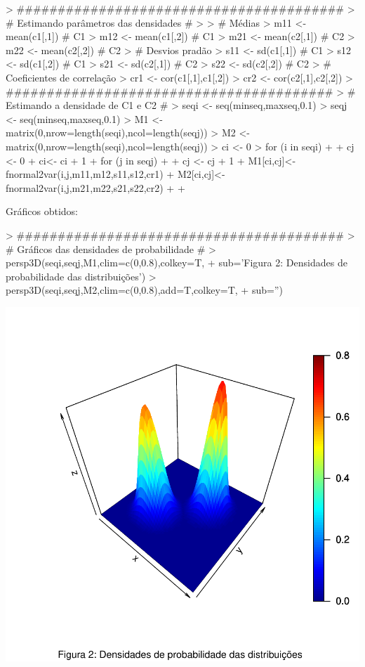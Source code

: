 \documentclass{article}
\begin{document}
\begin{Schunk}
\begin{Sinput}
> ########################################
> # Estimando parâmetros das densidades #
> 
> # Médias
> m11 <- mean(c1[,1]) # C1
> m12 <- mean(c1[,2]) # C1
> m21 <- mean(c2[,1]) # C2
> m22 <- mean(c2[,2]) # C2
> # Desvios pradão
> s11 <- sd(c1[,1]) # C1
> s12 <- sd(c1[,2]) # C1
> s21 <- sd(c2[,1]) # C2
> s22 <- sd(c2[,2]) # C2
> # Coeficientes de correlação
> cr1 <- cor(c1[,1],c1[,2])
> cr2 <- cor(c2[,1],c2[,2])
> ########################################
> # Estimando a densidade de C1 e C2 #
> seqi <- seq(minseq,maxseq,0.1)
> seqj <- seq(minseq,maxseq,0.1)
> M1 <- matrix(0,nrow=length(seqi),ncol=length(seqj))
> M2 <- matrix(0,nrow=length(seqi),ncol=length(seqj))
> ci <- 0
> for (i in seqi)
+ {
+   cj <- 0
+   ci<- ci + 1
+   for (j in seqj)
+   {
+     cj <- cj + 1
+     M1[ci,cj]<-fnormal2var(i,j,m11,m12,s11,s12,cr1)
+     M2[ci,cj]<-fnormal2var(i,j,m21,m22,s21,s22,cr2)
+   }
+ }
\end{Sinput}
\end{Schunk}

Gráficos obtidos:

\begin{Schunk}
\begin{Sinput}
> ########################################
> # Gráficos das densidades de probabilidade #
> persp3D(seqi,seqj,M1,clim=c(0,0.8),colkey=T, 
+         sub='Figura 2: Densidades de probabilidade das distribuições')
> persp3D(seqi,seqj,M2,clim=c(0,0.8),add=T,colkey=T,
+         sub='')
\end{Sinput}
\end{Schunk}
\includegraphics{gaussr2-003}
\end{document}

